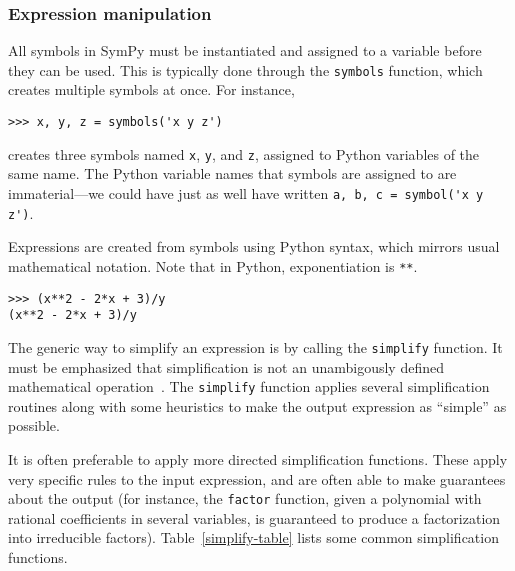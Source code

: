 
\subsubsection{Expression manipulation}


All symbols in SymPy must be instantiated and assigned to a variable before
they can be used. This is typically done through the \texttt{symbols}
function, which creates multiple symbols at once. For instance,

\begin{verbatim}
>>> x, y, z = symbols('x y z')
\end{verbatim}

creates three symbols named \texttt{x}, \texttt{y}, and \texttt{z}, assigned
to Python variables of the same name. The Python variable names that symbols
are assigned to are immaterial---we could have just as well have written
\verb|a, b, c = symbol('x y z')|.

Expressions are created from symbols using Python syntax, which mirrors usual
mathematical notation. Note that in Python, exponentiation is \verb|**|.

\begin{verbatim}
>>> (x**2 - 2*x + 3)/y
(x**2 - 2*x + 3)/y
\end{verbatim}





The generic way to simplify an expression is by calling the \texttt{simplify}
function.
It must be emphasized that simplification is not an unambigously defined
mathematical operation~\cite{Carette2004understanding}.
The \texttt{simplify} function applies several simplification routines along
with some heuristics to make the output expression as ``simple'' as possible.

It is often preferable to apply more directed simplification functions. These
apply very specific rules to the input expression, and are often able to make
guarantees about the output (for instance, the \texttt{factor} function, given
a polynomial with rational coefficients in several variables, is guaranteed to
produce a factorization into irreducible factors).
Table~\ref{simplify-table} lists some common simplification functions.

